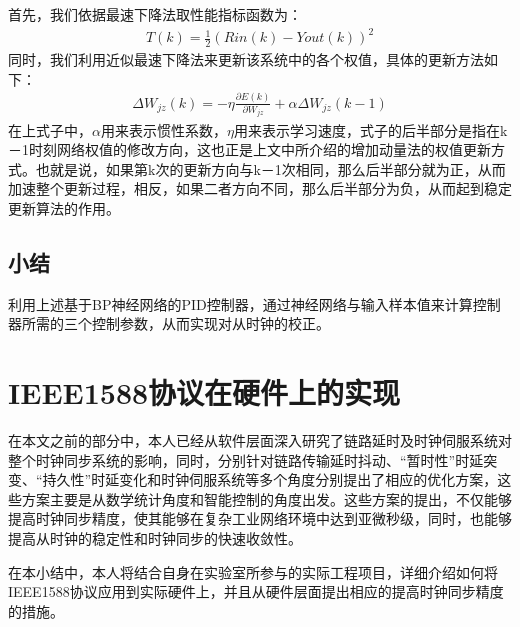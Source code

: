 首先，我们依据最速下降法取性能指标函数为：
\begin{align}
T(k) = \frac{1}{2}(Rin(k) - Yout(k))^{2}
\end{align}
同时，我们利用近似最速下降法来更新该系统中的各个权值，具体的更新方法如下：
\begin{align}
\Delta W_{jz}(k) = -\eta \frac{\partial E(k)}{\partial W_{jz}} + \alpha \Delta W_{jz}(k-1)
\end{align}
在上式子中，$\alpha$用来表示惯性系数，$\eta$用来表示学习速度，式子的后半部分是指在k－1时刻网络权值的修改方向，这也正是上文中所介绍的增加动量法的权值更新方式。也就是说，如果第k次的更新方向与k－1次相同，那么后半部分就为正，从而加速整个更新过程，相反，如果二者方向不同，那么后半部分为负，从而起到稳定更新算法的作用。

\subsection{小结}
利用上述基于BP神经网络的PID控制器，通过神经网络与输入样本值来计算控制器所需的三个控制参数，从而实现对从时钟的校正。


\section{IEEE1588协议在硬件上的实现}
在本文之前的部分中，本人已经从软件层面深入研究了链路延时及时钟伺服系统对整个时钟同步系统的影响，同时，分别针对链路传输延时抖动、“暂时性”时延突变、“持久性”时延变化和时钟伺服系统等多个角度分别提出了相应的优化方案，这些方案主要是从数学统计角度和智能控制的角度出发。这些方案的提出，不仅能够提高时钟同步精度，使其能够在复杂工业网络环境中达到亚微秒级，同时，也能够提高从时钟的稳定性和时钟同步的快速收敛性。

在本小结中，本人将结合自身在实验室所参与的实际工程项目，详细介绍如何将IEEE1588协议应用到实际硬件上，并且从硬件层面提出相应的提高时钟同步精度的措施。






